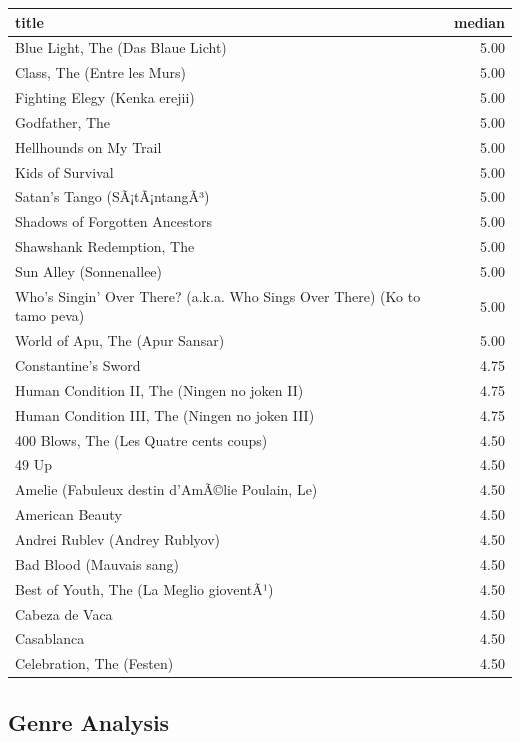\documentclass[
]{article}
\begin{document}
\begin{table}
\centering\begingroup\fontsize{10}{12}\selectfont

\begin{tabular}{l|r}
\hline
title & median\\
\hline
Blue Light, The (Das Blaue Licht) & 5.00\\
\hline
Class, The (Entre les Murs) & 5.00\\
\hline
Fighting Elegy (Kenka erejii) & 5.00\\
\hline
Godfather, The & 5.00\\
\hline
Hellhounds on My Trail & 5.00\\
\hline
Kids of Survival & 5.00\\
\hline
Satan's Tango (SÃ¡tÃ¡ntangÃ³) & 5.00\\
\hline
Shadows of Forgotten Ancestors & 5.00\\
\hline
Shawshank Redemption, The & 5.00\\
\hline
Sun Alley (Sonnenallee) & 5.00\\
\hline
Who's Singin' Over There? (a.k.a. Who Sings Over There) (Ko to tamo peva) & 5.00\\
\hline
World of Apu, The (Apur Sansar) & 5.00\\
\hline
Constantine's Sword & 4.75\\
\hline
Human Condition II, The (Ningen no joken II) & 4.75\\
\hline
Human Condition III, The (Ningen no joken III) & 4.75\\
\hline
400 Blows, The (Les Quatre cents coups) & 4.50\\
\hline
49 Up & 4.50\\
\hline
Amelie (Fabuleux destin d'AmÃ©lie Poulain, Le) & 4.50\\
\hline
American Beauty & 4.50\\
\hline
Andrei Rublev (Andrey Rublyov) & 4.50\\
\hline
Bad Blood (Mauvais sang) & 4.50\\
\hline
Best of Youth, The (La Meglio gioventÃ¹) & 4.50\\
\hline
Cabeza de Vaca & 4.50\\
\hline
Casablanca & 4.50\\
\hline
Celebration, The (Festen) & 4.50\\
\hline
\end{tabular}
\endgroup{}
\end{table}

\hypertarget{genre-analysis}{%
\subsection{Genre Analysis}\label{genre-analysis}}
\end{document}
